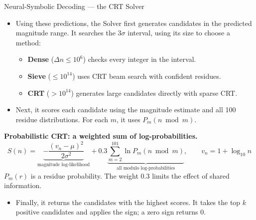 \documentclass[aspectratio=169,10pt]{beamer}
\newcommand{\tightlist}{\setlength{\itemsep}{0.2em}}
\newcommand{\readout}[1]{\textcolor{readoutblue}{{\mdseries #1}}}
\begin{document}
\begin{frame}{Neural-Symbolic Decoding --- the CRT Solver}
\small
  \setlength{\parskip}{0pt}
  \begin{itemize}\small\tightlist
    \item \readout{Using these predictions, the Solver first generates candidates in the predicted magnitude range.}
          It searches the $3\sigma$ interval, using its size to choose a method:
      \begin{itemize}
        \item \textbf{Dense} ($\Delta n \le 10^6$) checks every integer in the interval.
        \item \textbf{Sieve} ($\le 10^{14}$) uses CRT beam search with confident residues.
        \item \textbf{CRT} ($> 10^{14}$) generates large candidates directly with sparse CRT.
      \end{itemize}
    \item \readout{Next, it scores each candidate using the magnitude estimate and all 100 residue distributions.}
          For each $m$, it uses $P_m(n \bmod m)$.
  \end{itemize}
  \textbf{Probabilistic CRT: a weighted sum of log-probabilities.}
  {
    \setlength{\abovedisplayskip}{3pt}
    \setlength{\belowdisplayskip}{3pt}
    \[
      S(n) = \underbrace{-\frac{(v_n-\mu)^2}{2\sigma^2}}_{\text{magnitude log-likelihood}}
           + 0.3\underbrace{\sum_{m=2}^{101}\ln P_m(n\bmod m)}_{\text{all modulo log-probabilities}},
      \qquad v_n=1+\log_{10}n
    \]
    \footnotesize
    $P_m(r)$ is a residue probability. The weight 0.3 limits the effect of shared information.
    }
  \begin{itemize}\small\tightlist
    \item \readout{Finally, it returns the candidates with the highest scores.}
          It takes the top $k$ positive candidates and applies the sign; a zero sign returns 0.
  \end{itemize}
\end{frame}
\end{document}
